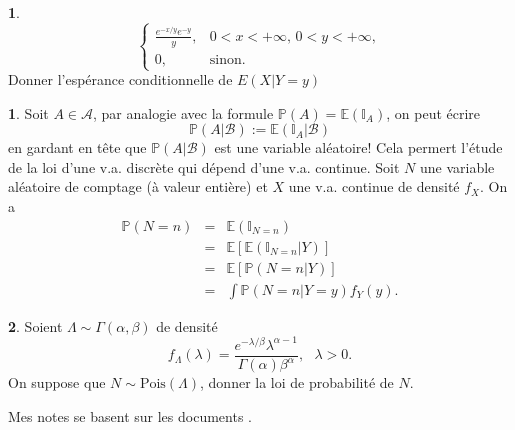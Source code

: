 \documentclass[8pt,notheorems]{beamer}
\def \E{\mathbb E}
\renewcommand{\Pr}{\mathbb{P}}
\theoremstyle{definition}
\theoremstyle{example}
\newtheorem{example}{\translate{Exemple}}
\newtheorem{remark}{\translate{Remarque}}
\theoremstyle{mystyle}
\theoremstyle{plain}
\begin{document}
\begin{frame}[allowframebreaks]
\begin{example}
\begin{equation*}
\begin{cases}
\frac{e^{-x/y}e^{-y}}{y},&0< x< +\infty\text{, }0< y<+\infty,\\
0,&\text{sinon}.
\end{cases}
\end{equation*}
Donner l'espérance conditionnelle de $E(X|Y = y)$
\end{example}
\begin{remark}
Soit $A\in\mathcal{A}$, par analogie avec la formule $\Pr(A) = \E(\mathbb{I}_A)$, on peut écrire 
$$
\Pr(A|\mathcal{B}) := \E(\mathbb{I}_A|\mathcal{B})
$$
en gardant en tête que $\Pr(A|\mathcal{B})$ est une variable aléatoire! Cela permert l'étude de la loi d'une v.a. discrète qui dépend d'une v.a. continue. Soit $N$ une variable aléatoire de comptage (à valeur entière) et $X$ une v.a. continue de densité $f_X$. On a
\begin{eqnarray*}
\mathbb{P}(N = n)&=&\E(\mathbb{I}_{N = n})\\
&=&\E[\E(\mathbb{I}_{N = n}|Y)]\\
&=&\E[\Pr(N = n|Y)]\\
&=&\int \Pr(N = n|Y=y)f_Y(y).
\end{eqnarray*}
\end{remark}
\begin{example}
Soient $\Lambda\sim \Gamma (\alpha, \beta)$ de densité 
$$
f_{\Lambda}(\lambda) = \frac{e^{-\lambda/\beta}\lambda^{\alpha-1}}{\Gamma(\alpha)\beta^\alpha},\text{ }\lambda>0.
$$
On suppose que $N\sim\text{Pois}(\Lambda)$, donner la loi de probabilité de $N$.
\end{example}
\end{frame}
\begin{frame}
Mes notes se basent sur les documents \cite{TruquetEnsai,Nabil17,Hohn,le2006integration}.


\end{frame}
\end{document}

